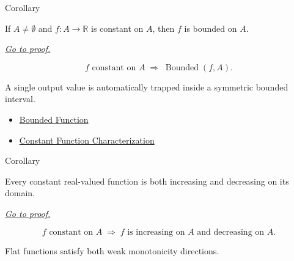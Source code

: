 \begin{corollarybox}{Corollary}
\begin{corollary}
\label{cor:constant-functions-are-bounded}
If \(A\neq\emptyset\) and \(f:A\to\mathbb{R}\) is constant on \(A\), then
\(f\) is bounded on \(A\).

\smallskip\noindent
\hyperref[prf:constant-functions-are-bounded]{\textit{Go to proof.}}
\end{corollary}
\end{corollarybox}

\begin{remark*}
\[
  f\text{ constant on }A
  \;\Longrightarrow\;
  \operatorname{Bounded}(f,A).
\]
\end{remark*}

\begin{remark*}[Interpretation]
A single output value is automatically trapped inside a symmetric bounded
interval.
\end{remark*}

\begin{dependencies}
\begin{itemize}
  \item \hyperref[def:function-bounded]{Bounded Function}
  \item \hyperref[prop:constant-function-characterization]{Constant Function Characterization}
\end{itemize}
\end{dependencies}

\begin{corollarybox}{Corollary}
\begin{corollary}
\label{cor:constant-functions-are-monotone}
Every constant real-valued function is both increasing and decreasing on its
domain.

\smallskip\noindent
\hyperref[prf:constant-functions-are-monotone]{\textit{Go to proof.}}
\end{corollary}
\end{corollarybox}

\begin{remark*}
\[
  f\text{ constant on }A
  \;\Longrightarrow\;
  f\text{ is increasing on }A\text{ and decreasing on }A.
\]
\end{remark*}

\begin{remark*}[Interpretation]
Flat functions satisfy both weak monotonicity directions.
\end{remark*}

